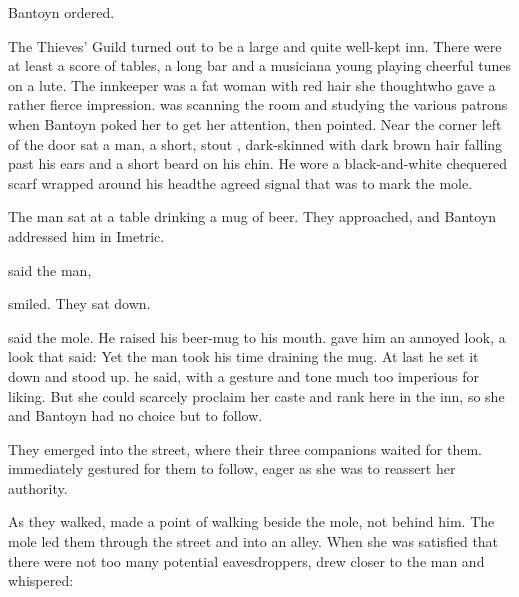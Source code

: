  Bantoyn ordered. 

The Thieves' Guild turned out to be a large and quite well-kept inn. There were at least a score of tables, a long bar and a musician\dash{}a young \sphyle\dash{}playing cheerful tunes on a lute. The innkeeper was a fat woman with red hair\dash{} she thought\dash{}who gave a rather fierce impression. \Filgzed{} was scanning the room and studying the various patrons when Bantoyn poked her to get her attention, then pointed. Near the corner left of the door sat a man, a short, stout \human{}, dark-skinned with dark brown hair falling past his ears and a short beard on his chin. He wore a black-and-white chequered scarf wrapped around his head\dash{}the agreed signal that was to mark the mole. 

The man sat at a table drinking a mug of beer. They approached, and Bantoyn addressed him in Imetric.  

 said the man,  

\Filgzed{} smiled.  They sat down. 

 said the mole.  He raised his beer-mug to his mouth. \Filgzed{} gave him an annoyed look, a look that said:  Yet the man took his time draining the mug. At last he set it down and stood up.  he said, with a gesture and tone much too imperious for \Filgzedz{} liking.  But she could scarcely proclaim her caste and rank here in the inn, so she and Bantoyn had no choice but to follow. 

They emerged into the street, where their three companions waited for them. \Filgzed{} immediately gestured for them to follow, eager as she was to reassert her authority. 

As they walked, \Filgzed{} made a point of walking beside the mole, not behind him. The mole led them through the street and into an alley. When she was satisfied that there were not too many potential eavesdroppers, \Filgzed{} drew closer to the man and whispered: 

